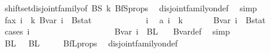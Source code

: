 \begin{isabellebody}
\ shiftset{\isacharunderscore}{\kern0pt}disjoint{\isacharunderscore}{\kern0pt}family{\isacharbrackleft}{\kern0pt}of\ BS\ k{\isacharbrackright}{\kern0pt}\ BfS{\isacharunderscore}{\kern0pt}props\ \isamarkupfalse%
\ disjoint{\isacharunderscore}{\kern0pt}family{\isacharunderscore}{\kern0pt}on{\isacharunderscore}{\kern0pt}def\ \isamarkupfalse%
\ simp\ \isanewline
\ \ \ \ \isamarkupfalse%
\ fax{}{\isacharcolon}{\kern0pt}\ {\isachardoublequoteopen}{\isasymforall}i\ {\isasymin}\ {\isacharbraceleft}{\kern0pt}{\isachardot}{\kern0pt}{\isachardot}{\kern0pt}{\isacharless}{\kern0pt}k{\isacharplus}{\kern0pt}{}{\isacharbraceright}{\kern0pt}{\isachardot}{\kern0pt}\ Bvar\ i\ {\isasyminter}\ Bstat\ {\isacharequal}{\kern0pt}\ {\isacharbraceleft}{\kern0pt}{\isacharbraceright}{\kern0pt}{\isachardoublequoteclose}\isanewline
\ \ \ \isamarkupfalse%
\isanewline
\ \ \ \ \ \isamarkupfalse%
\ i\ \isamarkupfalse%
\ a{\isacharcolon}{\kern0pt}\ {\isachardoublequoteopen}i\ {\isasymin}\ {\isacharbraceleft}{\kern0pt}{\isachardot}{\kern0pt}{\isachardot}{\kern0pt}{\isacharless}{\kern0pt}k{\isacharplus}{\kern0pt}{}{\isacharbraceright}{\kern0pt}{\isachardoublequoteclose}\isanewline
\ \ \ \ \ \isamarkupfalse%
\ {\isachardoublequoteopen}Bvar\ i\ {\isasyminter}\ Bstat\ {\isacharequal}{\kern0pt}\ {\isacharbraceleft}{\kern0pt}{\isacharbraceright}{\kern0pt}{\isachardoublequoteclose}\isanewline
\ \ \ \ \ \isamarkupfalse%
\ {\isacharparenleft}{\kern0pt}cases\ i{\isacharparenright}{\kern0pt}\isanewline
\ \ \ \ \ \ \ \isamarkupfalse%
\ {}\isanewline
\ \ \ \ \ \ \ \isamarkupfalse%
\ \isamarkupfalse%
\ {\isachardoublequoteopen}Bvar\ i\ {\isacharequal}{\kern0pt}\ BL\ {}{\isachardoublequoteclose}\ \isamarkupfalse%
\ Bvar{\isacharunderscore}{\kern0pt}def\ \isamarkupfalse%
\ simp\isanewline
\ \ \ \ \ \ \ \isamarkupfalse%
\ \isamarkupfalse%
\ {\isachardoublequoteopen}BL\ {}\ {\isasyminter}\ BL\ {}\ {\isacharequal}{\kern0pt}\ {\isacharbraceleft}{\kern0pt}{\isacharbraceright}{\kern0pt}{\isachardoublequoteclose}\ \isamarkupfalse%
\ BfL{\isacharunderscore}{\kern0pt}props\ \isamarkupfalse%
\ disjoint{\isacharunderscore}{\kern0pt}family{\isacharunderscore}{\kern0pt}on{\isacharunderscore}{\kern0pt}def\ \isamarkupfalse%

\end{isabellebody}
